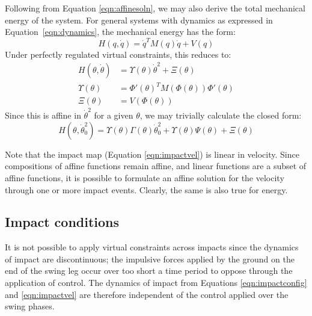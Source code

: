 Following from Equation \ref{eqn:affinesoln}, we may also derive the total mechanical energy of the system. For general systems with dynamics as expressed in Equation~\ref{eqn:dynamics}, the mechanical energy has the form:
\[ H\left(q,\dot{q}\right) = \dot{q}^TM(q)\dot{q} + V(q) \]
Under perfectly regulated virtual constraints, this reduces to:
\begin{align*}
	H\left(\theta,\dot{\theta}\right) &= \Upsilon(\theta)\dot{\theta}^2+\Xi(\theta) \\
	\Upsilon(\theta) &= \Phi'(\theta)^TM\left(\Phi(\theta)\right)\Phi'(\theta) \\
	\Xi(\theta) &= V\left(\Phi(\theta)\right)
\end{align*}
Since this is affine in $\dot{\theta}^2$ for a given $\theta$, we may trivially calculate the closed form:
\begin{equation}
	H\left(\theta, \dot{\theta}_0^2\right) =
	\Upsilon(\theta)\Gamma\left(\theta\right)\dot{\theta}_0^2 +
	\Upsilon(\theta)\Psi\left(\theta\right) + \Xi(\theta)
\end{equation}

Note that the impact map (Equation \ref{eqn:impactvel}) is linear in velocity. Since compositions of affine functions remain affine, and linear functions are a subset of affine functions, it is possible to formulate an affine solution for the velocity through one or more impact events. Clearly, the same is also true for energy.

\subsection{Impact conditions} \label{sec:impact}
It is not possible to apply virtual constraints across impacts since the dynamics of impact are discontinuous; the impulsive forces applied by the ground on the end of the swing leg occur over too short a time period to oppose through the application of control. The dynamics of impact from Equations \ref{eqn:impactconfig} and \ref{eqn:impactvel} are therefore independent of the control applied over the swing phases. 

